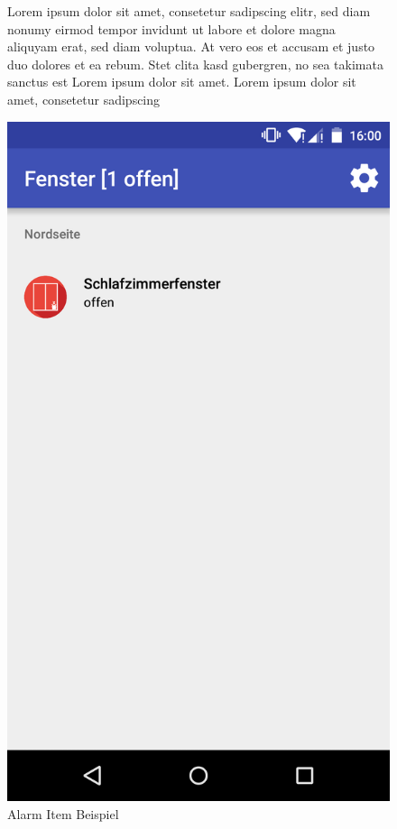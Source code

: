 \begin{figure}[htbp]
	\begin{minipage}{0.6\textwidth} 
Lorem ipsum dolor sit amet, consetetur sadipscing elitr, sed diam nonumy eirmod tempor invidunt ut labore et dolore magna aliquyam erat, sed diam voluptua. At vero eos et accusam et justo duo dolores et ea rebum. Stet clita kasd gubergren, no sea takimata sanctus est Lorem ipsum dolor sit amet. Lorem ipsum dolor sit amet, consetetur sadipscing 
	\end{minipage}
	\hfill
	\begin{minipage}{0.32\textwidth}
		\includegraphics[scale=0.12]{appendix/img/AppScreenshots/Screenshot6}
		\caption{Alarm Item Beispiel}
		\label{fig:screenshot_6}
	\end{minipage}
\end{figure}

